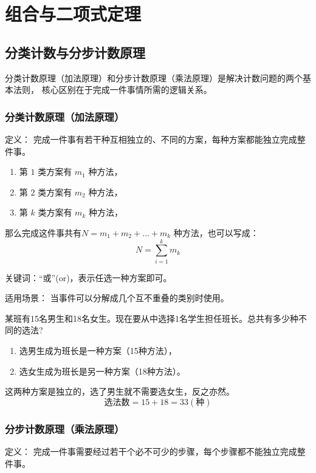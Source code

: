 
\section{组合与二项式定理}
\label{sec:polynomial-power-theorem}

\subsection{分类计数与分步计数原理}
\label{sec:principle-of-count-by-categries-or-step}
分类计数原理（加法原理）和分步计数原理（乘法原理）是解决计数问题的两个基本法则，
核心区别在于完成一件事情所需的逻辑关系。


\subsubsection{分类计数原理（加法原理）}
定义： 完成一件事有若干种互相独立的、不同的方案，每种方案都能独立完成整件事。
\begin{enumerate}
  \item 第 \(1\) 类方案有 \(m_{1}\) 种方法，
  \item 第 \(2\) 类方案有 \(m_{2}\) 种方法，
  \item 第 \(k\) 类方案有 \(m_{k}\) 种方法，
\end{enumerate}
那么完成这件事共有\(N=m_{1}+m_{2}+\dots +m_{k}\) 种方法，也可以写成：
\[ N = \sum_{i=1}^k m_k\]

关键词：“或”(or)，表示任选一种方案即可。

适用场景： 当事件可以分解成几个互不重叠的类别时使用。

\begin{example}
  某班有15名男生和18名女生。现在要从中选择1名学生担任班长。总共有多少种不同的选法?

  \begin{enumerate}
    \item 选男生成为班长是一种方案（15种方法），
    \item 选女生成为班长是另一种方案（18种方法）。
  \end{enumerate}
这两种方案是独立的，选了男生就不需要选女生，反之亦然。
  \[ \textit{选法数} = 15 + 18 = 33 (\textit{种}) \]

\end{example}

\subsubsection{分步计数原理（乘法原理）}
定义： 完成一件事需要经过若干个必不可少的步骤，每个步骤都不能独立完成整件事。

